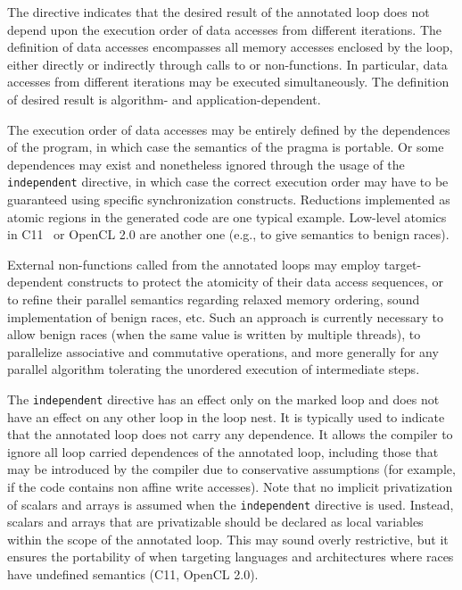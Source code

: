 
The directive indicates that the desired result of the annotated
loop does not depend upon the execution order of data accesses
from different iterations.  The definition of data accesses
encompasses all memory accesses enclosed by the loop, either directly
or indirectly through calls to \pencil or non-\pencil functions. In
particular, data accesses from different iterations may be executed
simultaneously. The definition of desired result is algorithm- and
application-dependent.

The execution order of data accesses may be entirely defined by
the dependences of the \pencil program, in which case the semantics of
the pragma is portable. Or some dependences may exist and nonetheless
ignored through the usage of the \lstinline!independent! directive,
in which case the correct execution order may have to be guaranteed
using specific synchronization constructs.
Reductions implemented as atomic regions in the generated code are one
typical example. Low-level atomics in C11~\cite{c11} or OpenCL 2.0 are another one
(e.g., to give semantics to benign races).

External non-\pencil functions called from the annotated loops
may employ target-dependent constructs to protect the atomicity of
their data access sequences, or to refine their parallel semantics
regarding relaxed memory ordering, sound implementation of benign
races, etc.
Such an approach is
currently necessary to allow benign races (when the same value is
written by multiple threads), to parallelize associative and commutative
operations, and more generally for any parallel algorithm tolerating
the unordered execution of intermediate steps.

The \lstinline!independent! directive has an effect only on the marked loop
and does not have an effect on any other loop in the loop nest.
It is typically used to indicate
that the annotated loop does not carry any dependence.  It allows the
compiler to ignore all loop carried dependences of the annotated loop,
including those that may be introduced by the compiler due to
conservative assumptions (for example, if the code contains non affine
write accesses).
Note that no implicit privatization of scalars and arrays is assumed when
the \lstinline!independent! directive is used.  Instead, scalars and
arrays that are privatizable should be declared as local variables
within the scope of the annotated loop.
This may sound overly restrictive, but it ensures the portability of
\pencil when targeting languages and architectures where races have
undefined semantics (C11, OpenCL 2.0).

